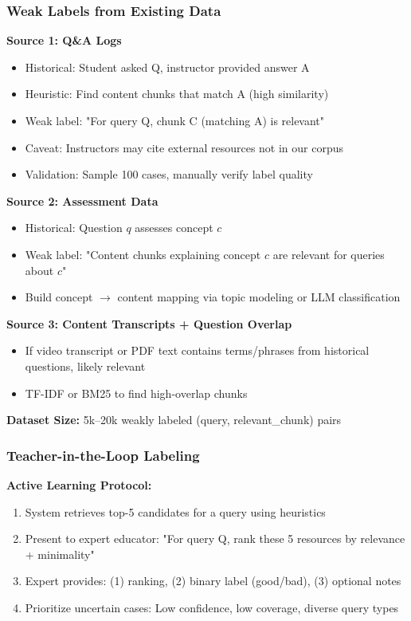 \documentclass[11pt,letterpaper]{article}
\begin{document}
\subsubsection{Weak Labels from Existing Data}

\textbf{Source 1: Q\&A Logs}
\begin{itemize}
\item Historical: Student asked Q, instructor provided answer A
\item Heuristic: Find content chunks that match A (high similarity)
\item Weak label: "For query Q, chunk C (matching A) is relevant"
\item Caveat: Instructors may cite external resources not in our corpus
\item Validation: Sample 100 cases, manually verify label quality
\end{itemize}

\textbf{Source 2: Assessment Data}
\begin{itemize}
\item Historical: Question $q$ assesses concept $c$
\item Weak label: "Content chunks explaining concept $c$ are relevant for queries about $c$"
\item Build concept $\rightarrow$ content mapping via topic modeling or LLM classification
\end{itemize}

\textbf{Source 3: Content Transcripts + Question Overlap}
\begin{itemize}
\item If video transcript or PDF text contains terms/phrases from historical questions, likely relevant
\item TF-IDF or BM25 to find high-overlap chunks
\end{itemize}

\textbf{Dataset Size:} 5k--20k weakly labeled (query, relevant\_chunk) pairs

\subsubsection{Teacher-in-the-Loop Labeling}

\textbf{Active Learning Protocol:}
\begin{enumerate}
\item System retrieves top-5 candidates for a query using heuristics
\item Present to expert educator: "For query Q, rank these 5 resources by relevance + minimality"
\item Expert provides: (1) ranking, (2) binary label (good/bad), (3) optional notes
\item Prioritize uncertain cases: Low confidence, low coverage, diverse query types
\end{enumerate}
\end{document}

